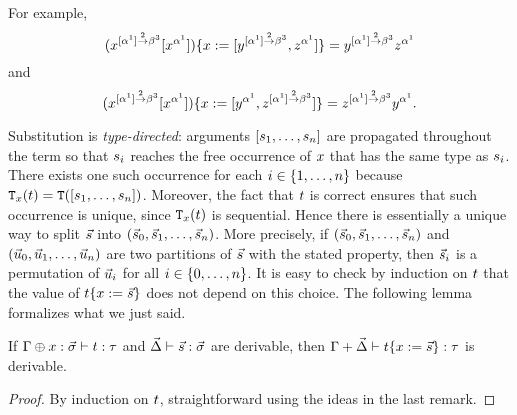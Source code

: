 For example,
\[(x^{[\alpha^1] \overset{2}{\to} \beta^3}[x^{\alpha^1}])\{x := [y^{[\alpha^1] \overset{2}{\to} \beta^3},z^{\alpha^1}]\}
= y^{[\alpha^1] \overset{2}{\to} \beta^3}z^{\alpha^1}\]
and
\[(x^{[\alpha^1] \overset{2}{\to} \beta^3}[x^{\alpha^1}])\{x := [y^{\alpha^1},z^{[\alpha^1] \overset{2}{\to} \beta^3}]\}
= z^{[\alpha^1] \overset{2}{\to} \beta^3}y^{\alpha^1}.\]


\begin{remark}
Substitution is {\em type-directed}: arguments $[s_1,\hdots,s_n]$
are propagated throughout the term
so that $s_i$ reaches the free occurrence of $x$
that has the same type as $s_i$.
There exists one such occurrence for each $i \in \{1, \hdots, n\}$ because
$\mathtt{T}_{x}(t) = \mathtt{T}([s_1,\hdots,s_n])$.
Moreover, the fact that $t$ is correct ensures that such occurrence is unique,
since $\mathtt{T}_{x}(t)$ is sequential.
Hence there is essentially a unique way to split $\vec{s}$
into $(\vec{s}_0, \vec{s}_1, \hdots, \vec{s}_n)$.
More precisely, if $(\vec{s}_0, \vec{s}_1, \hdots, \vec{s}_n)$
and $(\vec{u}_0, \vec{u}_1, \hdots, \vec{u}_n)$
are two partitions of $\vec{s}$ with the stated property,
then $\vec{s}_i$ is a permutation of $\vec{u}_i$ for all $i \in \{0,\hdots,n\}$.
It is easy to check by induction on $t$
that the value of $t\{x := \vec{s}\}$ does
not depend on this choice.
The following lemma formalizes what we just said.
\end{remark}


\begin{lemma}
If $\Gamma \oplus x : \vec{\sigma} \vdash t : \tau$
and $\vec{\Delta} \vdash \vec{s} : \vec{\sigma}$
are derivable,
then $\Gamma + \vec{\Delta} \vdash t\{x := \vec{s}\} : \tau$
is derivable.
\end{lemma}
\begin{proof}
By induction on $t$, straightforward using the ideas in the last remark.
\end{proof}


